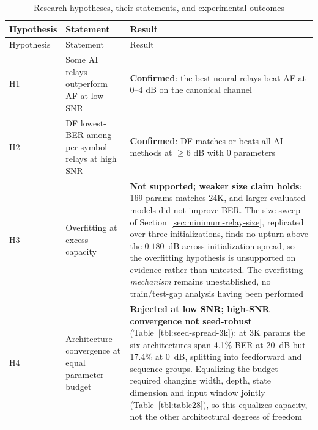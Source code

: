 \begin{longtable}[]{@{}
  >{\raggedright\arraybackslash}p{}
  >{\raggedright\arraybackslash}p{}
  >{\raggedright\arraybackslash}p{}@{}}
\caption[Hypothesis outcomes summary]{Research hypotheses, their statements, and experimental outcomes}\label{tbl:table33}\tabularnewline
\toprule\noalign{}
\begin{minipage}[b]{\linewidth}\raggedright
Hypothesis
\end{minipage} & \begin{minipage}[b]{\linewidth}\raggedright
Statement
\end{minipage} & \begin{minipage}[b]{\linewidth}\raggedright
Result
\end{minipage} \\
\midrule\noalign{}
\endfirsthead
\toprule\noalign{}
\begin{minipage}[b]{\linewidth}\raggedright
Hypothesis
\end{minipage} & \begin{minipage}[b]{\linewidth}\raggedright
Statement
\end{minipage} & \begin{minipage}[b]{\linewidth}\raggedright
Result
\end{minipage} \\
\midrule\noalign{}
\endhead
\bottomrule\noalign{}
\endlastfoot
H1 & Some AI relays outperform AF at low SNR & \textbf{Confirmed}: the best neural relays beat AF at 0--4 dB on the canonical channel \\
H2 & DF lowest-BER among per-symbol relays at high SNR & \textbf{Confirmed}: DF matches or beats all AI methods at \(\geq 6\) dB with 0 parameters \\
H3 & Overfitting at excess capacity & \textbf{Not supported; weaker size claim holds}: 169 params matches 24K, and larger evaluated models did not improve BER. The size sweep of Section~\ref{sec:minimum-relay-size}, replicated over three initializations, finds no upturn above the $0.180$~dB across-initialization spread, so the overfitting hypothesis is unsupported on evidence rather than untested. The overfitting \emph{mechanism} remains unestablished, no train/test-gap analysis having been performed \\
H4 & Architecture convergence at equal parameter budget & \textbf{Rejected at low SNR; high-SNR convergence not seed-robust} (Table~\ref{tbl:seed-spread-3k}): at 3K params the six architectures span 4.1\% BER at 20~dB but 17.4\% at 0~dB, splitting into feedforward and sequence groups. Equalizing the budget required changing width, depth, state dimension and input window jointly (Table~\ref{tbl:table28}), so this equalizes capacity, not the other architectural degrees of freedom \\

\end{longtable}
